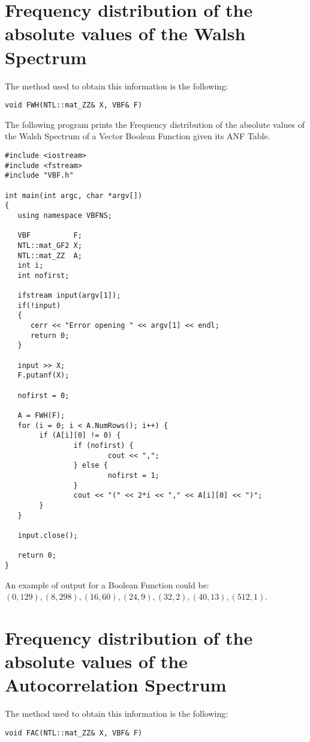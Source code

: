\section{Frequency distribution of the absolute values of the Walsh Spectrum}

The method used to obtain this information is the following:

\begin{verbatim}
void FWH(NTL::mat_ZZ& X, VBF& F)
\end{verbatim}

The following program prints the Frequency distribution of the absolute values of the Walsh Spectrum of a Vector Boolean Function given its ANF Table.

\begin{verbatim}
#include <iostream>
#include <fstream>
#include "VBF.h"

int main(int argc, char *argv[])
{
   using namespace VBFNS;

   VBF          F;
   NTL::mat_GF2 X;
   NTL::mat_ZZ  A;
   int i;
   int nofirst;

   ifstream input(argv[1]);
   if(!input)
   {
      cerr << "Error opening " << argv[1] << endl;
      return 0;
   }

   input >> X;
   F.putanf(X);

   nofirst = 0;

   A = FWH(F);
   for (i = 0; i < A.NumRows(); i++) {
        if (A[i][0] != 0) {
                if (nofirst) {
                        cout << ",";
                } else {
                        nofirst = 1;
                }
                cout << "(" << 2*i << "," << A[i][0] << ")";
        }
   }

   input.close();

   return 0;
}
\end{verbatim}

An example of output for a Boolean Function could be: $(0,129),(8,298),(16,60),(24,9),(32,2),(40,13),(512,1)$.

\section{Frequency distribution of the absolute values of the Autocorrelation Spectrum}

The method used to obtain this information is the following:

\begin{verbatim}
void FAC(NTL::mat_ZZ& X, VBF& F)
\end{verbatim}

